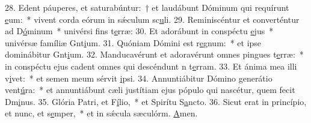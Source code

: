 28. Edent páuperes, et saturabúntur:~† et laudábunt Dóminum qui requírunt \uline{e}um:~* vivent corda eórum in sǽculum sc\uline{u}li.
29. Reminiscéntur et converténtur ad D\uline{ó}minum~* univérsi fins t\uline{e}rræ:
30. Et adorábunt in conspéctu \uline{e}jus~* univérsæ famíliæ Gnt\uline{i}um.
31. Quóniam Dómini est r\uline{e}gnum:~* et ipse dominábitur Gnt\uline{i}um.
32. Manducavérunt et adoravérunt omnes pingues t\uline{e}rræ:~* in conspéctu ejus cadent omnes qui descéndunt n t\uline{e}rram.
33. Et ánima mea illi v\uline{i}vet:~* et semen meum sérvit \uline{i}psi.
34. Annuntiábitur Dómino generátio vent\uline{ú}ra:~* et annuntiábunt cæli justítiam ejus pópulo qui nascétur, quem fecit Dm\uline{i}nus.
35. Glória Patri, et F\uline{í}lio,~* et Spirítu S\uline{a}ncto.
36. Sicut erat in princípio, et nunc, et s\uline{e}mper,~* et in sǽcula sæculórm. \uline{A}men.
